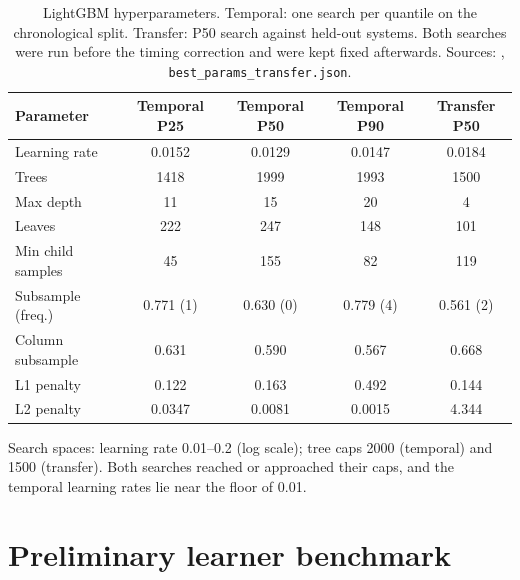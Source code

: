 \begin{table}[H]
\centering
\caption{LightGBM hyperparameters. Temporal: one search per quantile on the chronological split. Transfer: P50 search against held-out systems. Both searches were run before the timing correction and were kept fixed afterwards. Sources: , \texttt{best\_params\_transfer.json}.}
\label{tab:s-hparams}
\small
\begin{tabular}{@{}l c c c c@{}}
\toprule
Parameter & Temporal P25 & Temporal P50 & Temporal P90 & Transfer P50 \\
\midrule
Learning rate & 0.0152 & 0.0129 & 0.0147 & 0.0184 \\
Trees & 1418 & 1999 & 1993 & 1500 \\
Max depth & 11 & 15 & 20 & 4 \\
Leaves & 222 & 247 & 148 & 101 \\
Min child samples & 45 & 155 & 82 & 119 \\
Subsample (freq.) & 0.771 (1) & 0.630 (0) & 0.779 (4) & 0.561 (2) \\
Column subsample & 0.631 & 0.590 & 0.567 & 0.668 \\
L1 penalty & 0.122 & 0.163 & 0.492 & 0.144 \\
L2 penalty & 0.0347 & 0.0081 & 0.0015 & 4.344 \\
\bottomrule
\end{tabular}
\end{table}

Search spaces: learning rate 0.01--0.2 (log scale); tree caps 2000 (temporal) and 1500 (transfer). Both searches reached or approached their caps, and the temporal learning rates lie near the floor of 0.01.

\section{Preliminary learner benchmark}
\label{sec:s-learners}

